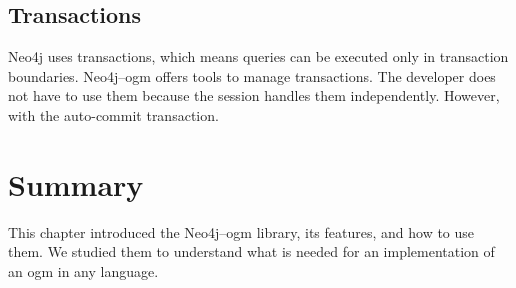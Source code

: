 \subsection{Transactions}

Neo4j uses transactions, which means queries can be executed only in transaction boundaries. Neo4j--\acrshort{ogm}
offers tools to manage transactions. The developer does not have to use them because the session handles them independently. However, with the auto-commit transaction.

\section{Summary}

This chapter introduced the Neo4j--\acrshort{ogm} library, its features, and how to use them. We studied them to understand what is needed for
an implementation of an \acrshort{ogm} in any language.